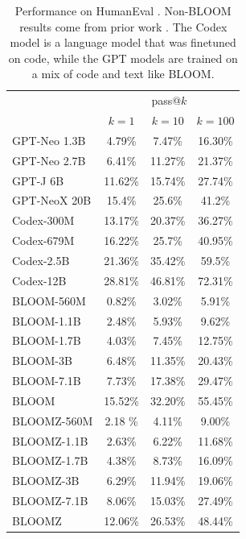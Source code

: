 \documentclass[twoside,11pt]{article}
\begin{document}
\begin{table}[ht!]
    \begin{center}
    \begin{small}
    \begin{sc}
    \begin{tabular}{lccc}
    \toprule
    & \multicolumn{3}{c}{pass@$k$} \\
    & $k=1$ & $k=10$ & $k=100$ \\
    \midrule
    GPT-Neo 1.3B & 4.79\% & 7.47\% & 16.30\% \\
    GPT-Neo 2.7B & 6.41\% & 11.27\% & 21.37\% \\
    GPT-J 6B & 11.62\% & 15.74\% & 27.74\% \\
    GPT-NeoX 20B & 15.4\% & 25.6\% & 41.2\% \\
    \midrule
    Codex-300M & 13.17\% & 20.37\% & 36.27\% \\
    Codex-679M & 16.22\% & 25.7\% & 40.95\% \\
    Codex-2.5B & 21.36\% & 35.42\% & 59.5\% \\
    Codex-12B & 28.81\% & 46.81\% & 72.31\% \\
    \midrule
    BLOOM-560M & 0.82\% & 3.02\% & 5.91\% \\
    BLOOM-1.1B & 2.48\% & 5.93\% & 9.62\% \\
    BLOOM-1.7B & 4.03\% & 7.45\% & 12.75\% \\
    BLOOM-3B & 6.48\% & 11.35\% & 20.43\% \\
    BLOOM-7.1B & 7.73\% & 17.38\% & 29.47\% \\
    BLOOM & 15.52\% & 32.20\% & 55.45\% \\
    \midrule
    BLOOMZ-560M & 2.18 \% & 4.11\% & 9.00\% \\
    BLOOMZ-1.1B & 2.63\% & 6.22\% & 11.68\% \\
    BLOOMZ-1.7B & 4.38\% & 8.73\% & 16.09\% \\
    BLOOMZ-3B & 6.29\% & 11.94\% & 19.06\% \\
    BLOOMZ-7.1B & 8.06\% & 15.03\% & 27.49\% \\
    BLOOMZ & 12.06\% & 26.53\% & 48.44\% \\
    \bottomrule
    \end{tabular}
    \caption{
        Performance on HumanEval \citep{chen2021evaluating}. Non-BLOOM results come from prior work \citep{chen2021evaluating,fried2022incoder}. The Codex model is a language model that was finetuned on code, while the GPT models \citep{black2021gpt,wang2021gpt,black2022gpt} are trained on a mix of code and text like BLOOM.
    }
    \label{tab:humaneval}
    \end{sc}
    \end{small}
    \end{center}
\end{table}
\end{document}
